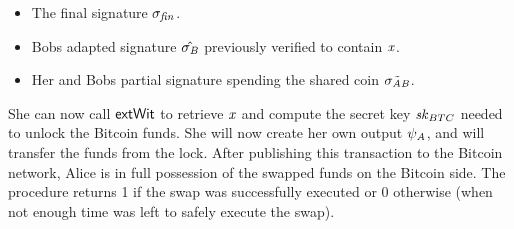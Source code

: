 \begin{itemize}
    \item The final signature $\sigma_{\mathit{fin}}$.
    \item Bobs adapted signature $\hat{\sigma_{\mathit{B}}}$ previously verified to contain $\mathit{x}$.
    \item Her and Bobs partial signature spending the shared coin $\tilde{\sigma_{\mathit{A}\mathit{B}}}$.
\end{itemize}
She can now call $\mathsf{extWit}$ to retrieve $\mathit{x}$ and compute the secret key $\mathit{sk}_{BTC}$ needed to unlock the Bitcoin funds.
She will now create her own output $\psi_{\mathit{A}}$, and will transfer the funds from the lock.
After publishing this transaction to the Bitcoin network, Alice is in full possession of the swapped funds on the Bitcoin side.
The procedure returns 1 if the swap was successfully executed or 0 otherwise (when not enough time was left to safely execute the swap).

\footnotetext[5]{$\procDSendCoins{\funArray{\varSpendableCoinAlice}}{\funArray{\varSpendableCoinBob}}{\varAmountMW}{\cnstFalsum}$}
\footnotetext[6]{$\procDAptFinTx{\funStar{\varPreTx}}{\varSecKeyAlice}{\varNonceAlice}{\varStatement}{\varSecKeyBob}{\varNonceBob}{\varSigBob}$}

